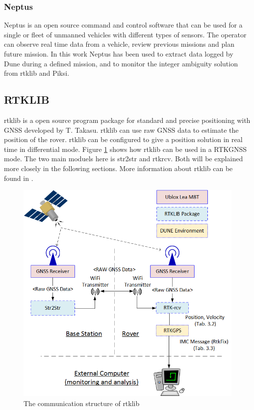 \subsubsection{Neptus}
Neptus is an open source command and control software that can be used for a single or fleet of unmanned vehicles with different types of sensors. The operator can observe real time data from a vehicle, review previous missions and plan future mission. In this work Neptus has been used to extract data logged by Dune during a defined mission, and to monitor the integer ambiguity solution from \gls{rtklib} and Piksi.
\subsection{RTKLIB}\label{ss:Rtklib}
\acrfull{rtklib} is a open source program package for standard and precise positioning with GNSS developed by T. Takasu. \gls{rtklib} can use raw GNSS data to estimate the position of the rover. \gls{rtklib} can be configured to give a position solution in real time in differential mode. Figure \ref{figure:RTKLIB_STRUCTURE} shows how \gls{rtklib} can be used in a RTKGNSS mode. The two main moduels here is str2str and rtkrcv. Both will be explained more closely in the following sections. More information about  \gls{rtklib} can be found in \citep{Rtklib242}.

\begin{figure}[H]
	\centering
		\includegraphics[width=1\textwidth]{figs/RTKLIB.png}
		\caption{The communication structure of \gls{rtklib}}
		\label{figure:RTKLIB_STRUCTURE}
\end{figure}

